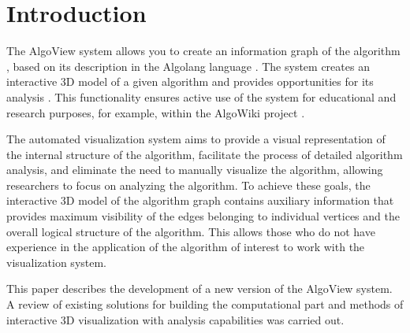 \section{Introduction}

The AlgoView system allows you to create an information graph of the algorithm \cite{m1}, based on its description in the Algolang language \cite{m2}. The system creates an interactive 3D model of a given algorithm and provides opportunities for its analysis \cite{m3}. This functionality ensures active use of the system for educational and research purposes, for example, within the AlgoWiki project \cite{m4,a1}.

The automated visualization system aims to provide a visual representation of the internal structure of the algorithm, facilitate the process of detailed algorithm analysis, and eliminate the need to manually visualize the algorithm, allowing researchers to focus on analyzing the algorithm. To achieve these goals, the interactive 3D model of the algorithm graph contains auxiliary information that provides maximum visibility of the edges belonging to individual vertices and the overall logical structure of the algorithm. This allows those who do not have experience in the application of the algorithm of interest to work with the visualization system.

This paper describes the development of a new version of the AlgoView system. A review of existing solutions for building the computational part and methods of interactive 3D visualization with analysis capabilities was carried out.
